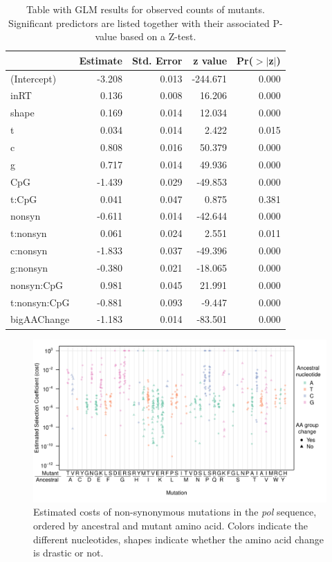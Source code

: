 \documentclass{article}
\begin{document}
\begin{table}[ht!]
\centering
\begin{tabular}{lrrrr}
  \hline
 & Estimate & Std. Error & z value & Pr($>$$|$z$|$) \\
 \hline
(Intercept) & -3.208 & 0.013 & -244.671 & 0.000 \\ 
 inRT & 0.136 & 0.008 & 16.206 & 0.000 \\ 
  shape & 0.169 & 0.014 & 12.034 & 0.000 \\ 
  \hline
  t & 0.034 & 0.014 & 2.422 & 0.015 \\ 
  c & 0.808 & 0.016 & 50.379 & 0.000 \\ 
  g & 0.717 & 0.014 & 49.936 & 0.000 \\ 
   CpG & -1.439 & 0.029 & -49.853 & 0.000 \\ 
   t:CpG & 0.041 & 0.047 & 0.875 & 0.381 \\ 
   \hline
  nonsyn & -0.611 & 0.014 & -42.644 & 0.000 \\ 
  t:nonsyn & 0.061 & 0.024 & 2.551 & 0.011 \\ 
  c:nonsyn & -1.833 & 0.037 & -49.396 & 0.000 \\ 
  g:nonsyn & -0.380 & 0.021 & -18.065 & 0.000 \\ 
  nonsyn:CpG & 0.981 & 0.045 & 21.991 & 0.000 \\ 
  t:nonsyn:CpG & -0.881 & 0.093 & -9.447 & 0.000 \\ 
  bigAAChange & -1.183 & 0.014 & -83.501 & 0.000 \\ 
  \hline
\end{tabular}
\caption{Table with GLM results for observed counts of mutants. Significant predictors are listed together with their associated P-value based on a Z-test.}
\label{GLM_results}
\end{table}

 
\pagebreak

\begin{figure}[ht!]
\centering
\includegraphics[scale = .7]{aachangesNS.pdf}
\caption{Estimated costs of non-synonymous mutations in the \textit {pol} sequence, ordered by ancestral and mutant amino acid. Colors indicate the different nucleotides, shapes indicate whether the amino acid change is drastic or not.}
\label{AA_effect}
\end{figure}
\end{document}
